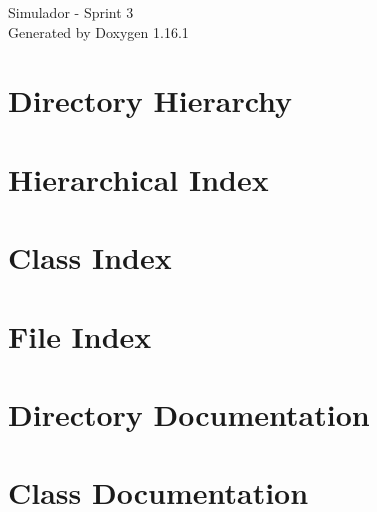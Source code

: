 \documentclass[twoside]{book}
\newcommand{\+}{\discretionary{\mbox{\scriptsize$\hookleftarrow$}}{}{}}
\newcommand{\clearemptydoublepage}{%
    \newpage{\pagestyle{empty}\cleardoublepage}%
  }
\begin{document}
  \raggedbottom
    \hypersetup{pageanchor=false,
                bookmarksnumbered=true,
                pdfencoding=unicode
               }
  \begin{titlepage}
  \vspace*{7cm}
  \begin{center}%
  {\Large Simulador -\/ Sprint 3}\\
  \vspace*{1cm}
  {\large Generated by Doxygen 1.16.1}\\
  \end{center}
  \end{titlepage}
  \clearemptydoublepage
  \tableofcontents
  \clearemptydoublepage
  \hypersetup{pageanchor=true}

\chapter{Directory Hierarchy}

\chapter{Hierarchical Index}

\chapter{Class Index}

\chapter{File Index}

\chapter{Directory Documentation}




\chapter{Class Documentation}



















\end{document}
